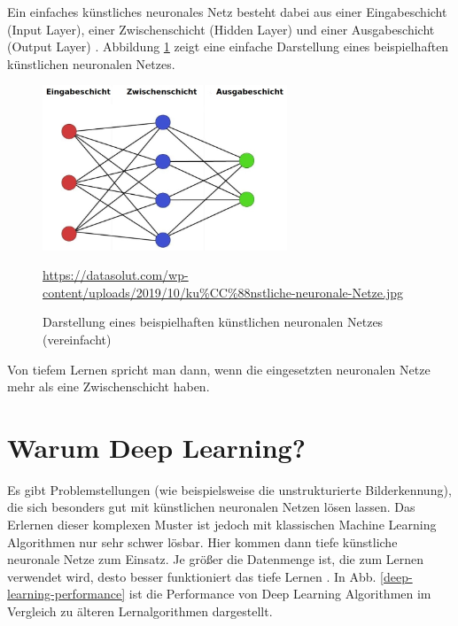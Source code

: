 Ein einfaches künstliches neuronales Netz besteht dabei aus einer Eingabeschicht (Input Layer), einer Zwischenschicht (Hidden Layer) und einer Ausgabeschicht (Output Layer) \cite{datasolut2}. Abbildung \ref{simple-net} zeigt eine einfache Darstellung eines beispielhaften künstlichen neuronalen Netzes.

\begin{figure}[H]
	\centering
	\includegraphics[width=0.65\textwidth]{kapitel3/images/Simples_Neuronales_Netz.jpg}
	\caption{Darstellung eines beispielhaften künstlichen neuronalen Netzes \\ (vereinfacht)}
	\label{simple-net}
	\vspace{0.2cm}
	\quelle\url{https://datasolut.com/wp-content/uploads/2019/10/ku%CC%88nstliche-neuronale-Netze.jpg}
\end{figure}

Von tiefem Lernen spricht man dann, wenn die eingesetzten neuronalen Netze mehr als eine Zwischenschicht haben.  \cite{datasolut2} 

\section{Warum Deep Learning?}

Es gibt Problemstellungen (wie beispielsweise die unstrukturierte Bilderkennung), die sich besonders gut mit künstlichen neuronalen Netzen lösen lassen. Das Erlernen dieser komplexen Muster ist jedoch mit klassischen Machine Learning Algorithmen nur sehr schwer lösbar. Hier kommen dann tiefe künstliche neuronale Netze zum Einsatz. Je größer die Datenmenge ist, die zum Lernen verwendet wird, desto besser funktioniert das tiefe Lernen \cite{datasolut2}. In Abb. \ref{deep-learning-performance} ist die Performance von Deep Learning Algorithmen im Vergleich zu älteren Lernalgorithmen dargestellt.

